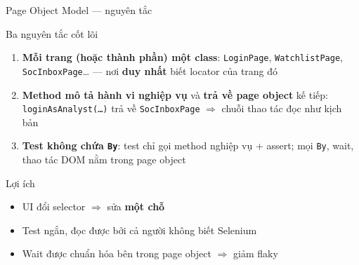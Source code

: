 \documentclass[aspectratio=169,12pt]{beamer}
\begin{document}
\begin{frame}{Page Object Model --- nguyên tắc}
  \vspace*{-0.4em}
  \begin{block}{Ba nguyên tắc cốt lõi}
    \begin{enumerate}
      \item \textbf{Mỗi trang (hoặc thành phần) một class}:
            \texttt{LoginPage}, \texttt{WatchlistPage},
            \texttt{SocInboxPage}\ldots{} --- nơi \textbf{duy nhất}
            biết locator của trang đó
      \item \textbf{Method mô tả hành vi nghiệp vụ} và
            \textbf{trả về page object} kế tiếp:
            \texttt{loginAsAnalyst(\ldots)} trả về
            \texttt{SocInboxPage} $\Rightarrow$ chuỗi thao tác
            đọc như kịch bản
      \item \textbf{Test không chứa \texttt{By}}: test chỉ gọi method
            nghiệp vụ + assert; mọi \texttt{By}, wait, thao tác DOM
            nằm trong page object
    \end{enumerate}
  \end{block}

  \begin{exampleblock}{Lợi ích}
    \begin{itemize}
      \item UI đổi selector $\Rightarrow$ sửa \textbf{một chỗ}
      \item Test ngắn, đọc được bởi cả người không biết Selenium
      \item Wait được chuẩn hóa bên trong page object
            $\Rightarrow$ giảm flaky
    \end{itemize}
  \end{exampleblock}
\end{frame}
\end{document}
